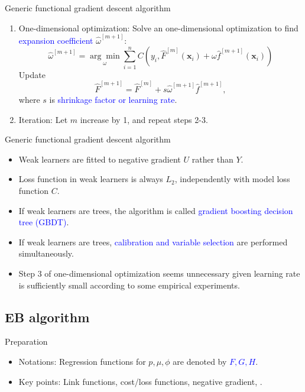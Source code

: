 \documentclass[professionalfont]{beamer}
\newcounter{saveenumi}
\newcommand{\conti}{\setcounter{enumi}{\value{saveenumi}}}
\def\bx{\boldsymbol{x}}
\newcommand{\blue}[1]{\textcolor{blue}{#1}}
\begin{document}
\begin{frame}{Generic functional gradient descent algorithm}
\begin{enumerate}
\conti
		\item One-dimensional optimization:
		Solve an one-dimensional optimization  to find \blue{expansion coefficient} $\hat{\omega}^{[m+1]}$:
		$$\hat{\omega}^{[m+1]}=\underset{\omega}{\arg\min}\sum_{i=1}^n C(y_i, \hat{F}^{[m]}(\bx_i)+\omega\hat{f}^{[m+1]}(\bx_i))$$
		Update $$\hat{F}^{[m+1]}=\hat{F}^{[m]}+s\hat{\omega}^{[m+1]}\hat{f}^{[m+1]},$$
		where $s$ is \blue{shrinkage factor or learning rate}.
		\item Iteration: Let $m$ increase by 1, and repeat steps 2-3.

	\end{enumerate}
\end{frame}

\begin{frame}{Generic functional gradient descent algorithm}

	\begin{itemize}
		\item Weak learners are fitted to negative gradient $U$ rather than $Y$.
		\item Loss function in weak learners is always $L_2$, independently with model loss function $C$.
		\item If weak learners are trees, the algorithm is called \blue{gradient boosting decision tree (GBDT)}.
		\item If weak learners are trees,  \blue{calibration and variable selection} are performed simultaneously.
		\item Step 3 of one-dimensional optimization seems unnecessary given learning rate is sufficiently small according to some empirical experiments.
	\end{itemize}
\end{frame}

\subsection{EB algorithm}

\begin{frame}{Preparation}



	\begin{itemize}
		\item 	Notations: Regression functions for $p,\mu,\phi$ are denoted by \blue{$F,G,H$}.

		\item Key points: Link functions, cost/loss functions, negative gradient, .

	\end{itemize}

\end{frame}
\end{document}
